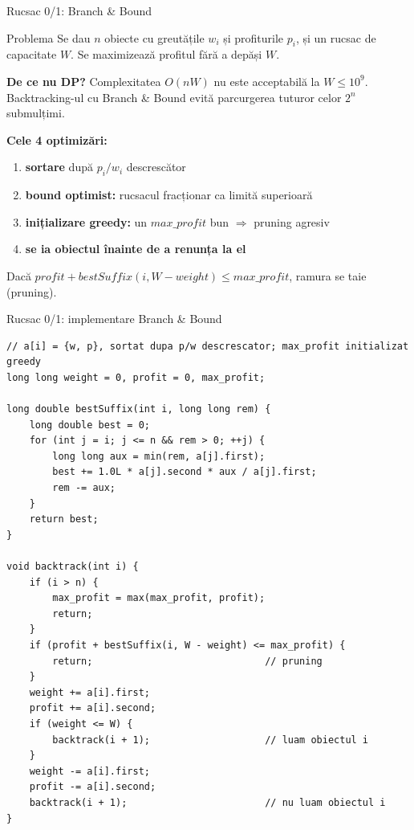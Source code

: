 \documentclass[8pt,mathserif]{beamer}
\begin{document}
\begin{frame}{Rucsac 0/1: Branch \& Bound}
  \begin{block}{Problema}
    Se dau $n$ obiecte cu greutățile $w_i$ și profiturile $p_i$, și un rucsac de capacitate $W$. Se maximizează profitul fără a depăși $W$.
  \end{block}
  \textbf{De ce nu DP?} Complexitatea $O(nW)$ nu este acceptabilă la $W \le 10^9$. Backtracking-ul cu Branch \& Bound evită parcurgerea tuturor celor $2^n$ submulțimi.
  \smallskip

  \textbf{Cele 4 optimizări:}
  \begin{enumerate}
    \item \textbf{sortare} după $p_i / w_i$ descrescător
    \item \textbf{bound optimist:} rucsacul fracționar ca limită superioară
    \item \textbf{inițializare greedy:} un $\mathit{max\_profit}$ bun $\Rightarrow$ pruning agresiv
    \item \textbf{se ia obiectul înainte de a renunța la el}
  \end{enumerate}
  \smallskip
  Dacă $\mathit{profit} + \mathit{bestSuffix}(i, W - \mathit{weight}) \le \mathit{max\_profit}$, ramura se taie (pruning).
\end{frame}

\begin{frame}[fragile]{Rucsac 0/1: implementare Branch \& Bound}
  \lstset{basicstyle=\ttfamily\footnotesize}
  \begin{lstlisting}
// a[i] = {w, p}, sortat dupa p/w descrescator; max_profit initializat greedy
long long weight = 0, profit = 0, max_profit;

long double bestSuffix(int i, long long rem) {
    long double best = 0;
    for (int j = i; j <= n && rem > 0; ++j) {
        long long aux = min(rem, a[j].first);
        best += 1.0L * a[j].second * aux / a[j].first;
        rem -= aux;
    }
    return best;
}

void backtrack(int i) {
    if (i > n) {
        max_profit = max(max_profit, profit);
        return;
    }
    if (profit + bestSuffix(i, W - weight) <= max_profit) {
        return;                              // pruning
    }
    weight += a[i].first;
    profit += a[i].second;
    if (weight <= W) {
        backtrack(i + 1);                    // luam obiectul i
    }
    weight -= a[i].first;
    profit -= a[i].second;
    backtrack(i + 1);                        // nu luam obiectul i
}
  \end{lstlisting}
\end{frame}
\end{document}
